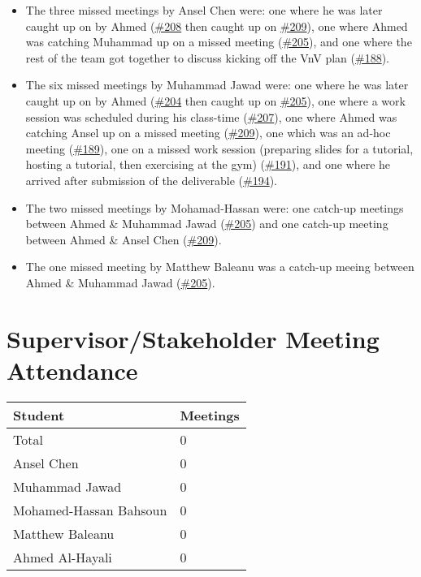 \documentclass{article}
\begin{document}
\begin{itemize}
    \item The three missed meetings by Ansel Chen were: one where he was later caught up on by Ahmed (\href{https://github.com/AhmedAl-Hayali/GenreGuru/issues/208}{\#208} then caught up on \href{https://github.com/AhmedAl-Hayali/GenreGuru/issues/209}{\#209}), one where Ahmed was catching Muhammad up on a missed meeting (\href{https://github.com/AhmedAl-Hayali/GenreGuru/issues/205}{\#205}), and one where the rest of the team got together to discuss kicking off the VnV plan (\href{https://github.com/AhmedAl-Hayali/GenreGuru/issues/188}{\#188}).
    \item The six missed meetings by Muhammad Jawad were: one where he was later caught up on by Ahmed (\href{https://github.com/AhmedAl-Hayali/GenreGuru/issues/204}{\#204} then caught up on \href{https://github.com/AhmedAl-Hayali/GenreGuru/issues/205}{\#205}), one where a work session was scheduled during his class-time (\href{https://github.com/AhmedAl-Hayali/GenreGuru/issues/207}{\#207}), one where Ahmed was catching Ansel up on a missed meeting (\href{https://github.com/AhmedAl-Hayali/GenreGuru/issues/209}{\#209}), one which was an ad-hoc meeting (\href{https://github.com/AhmedAl-Hayali/GenreGuru/issues/189}{\#189}), one on a missed work session (preparing slides for a tutorial, hosting a tutorial, then exercising at the gym) (\href{https://github.com/AhmedAl-Hayali/GenreGuru/issues/191}{\#191}), and one where he arrived after submission of the deliverable (\href{https://github.com/AhmedAl-Hayali/GenreGuru/issues/194}{\#194}).
    \item The two missed meetings by Mohamad-Hassan were: one catch-up meetings between Ahmed \& Muhammad Jawad (\href{https://github.com/AhmedAl-Hayali/GenreGuru/issues/205}{\#205}) and one catch-up meeting between Ahmed \& Ansel Chen (\href{https://github.com/AhmedAl-Hayali/GenreGuru/issues/209}{\#209}).
    \item The one missed meeting by Matthew Baleanu was a catch-up meeing between Ahmed \& Muhammad Jawad (\href{https://github.com/AhmedAl-Hayali/GenreGuru/issues/205}{\#205}).
\end{itemize}

\newpage
\section{Supervisor/Stakeholder Meeting Attendance}



\begin{table}[H]
\centering
\begin{tabular}{ll}
\toprule
\textbf{Student} & \textbf{Meetings}\\
\midrule
Total & 0\\
Ansel Chen & 0\\
Muhammad Jawad & 0\\
Mohamed-Hassan Bahsoun & 0\\
Matthew Baleanu & 0\\
Ahmed Al-Hayali & 0\\
\bottomrule
\end{tabular}
\end{table}
\end{document}
